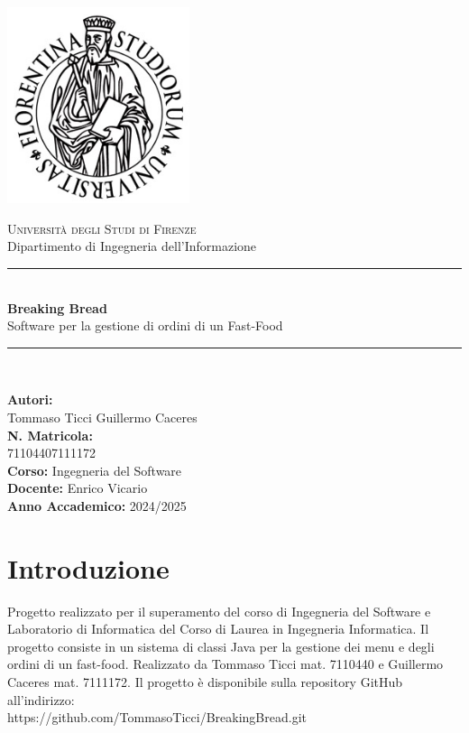 \documentclass{article}
\begin{document}
\begin{titlepage}
    \centering
    \includegraphics[width=0.4\textwidth]{imgs/Logo_unifi.jpg}\par\vspace{1cm}
    {\Large \textsc{Università degli Studi di Firenze}}\\
    {\large Dipartimento di Ingegneria dell'Informazione}\par\vspace{1cm}
    \rule{\linewidth}{0.5mm} \\[0.4cm]
    {\huge \textbf{Breaking Bread}}\\[0.2cm]
    {\Large Software per la gestione di ordini di un Fast-Food}\\
    \rule{\linewidth}{0.5mm} \\[1.5cm]

    \begin{flushleft}
        \textbf{Autori:}\\
        Tommaso Ticci \hspace{2cm} Guillermo Caceres\\
        \textbf{N. Matricola:} \\
        7110440\hspace{3.3cm}7111172\\[1cm]
        
        \textbf{Corso:} Ingegneria del Software\\[0.5cm]
        \textbf{Docente:} Enrico Vicario\\[0.5cm]
        \textbf{Anno Accademico:} 2024/2025
    \end{flushleft}
\end{titlepage}



\clearpage 

\tableofcontents
\newpage

\section{Introduzione}
Progetto realizzato per il superamento del corso di Ingegneria del Software e Laboratorio di Informatica del Corso di Laurea in Ingegneria Informatica. Il progetto consiste in un sistema di classi Java per la gestione dei menu e degli ordini di un fast-food. Realizzato da Tommaso Ticci mat. 7110440 e Guillermo Caceres mat. 7111172. Il progetto è disponibile sulla repository GitHub all'indirizzo:\\ https://github.com/TommasoTicci/BreakingBread.git
\end{document}
